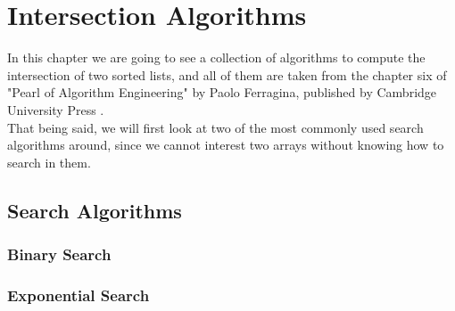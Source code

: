 \chapter{Intersection Algorithms\label{intersect}}

In this chapter we are going to see a collection of algorithms to compute the intersection of two sorted lists, and all of them are taken from the chapter six of "Pearl of Algorithm Engineering" by Paolo Ferragina, published by Cambridge University Press \citep{Ferragina_2023}. \\
That being said, we will first look at two of the most commonly used search algorithms around, since we cannot interest two arrays without knowing how to search in them. \\

\section{Search Algorithms}

\subsection{Binary Search}

\subsection{Exponential Search}
